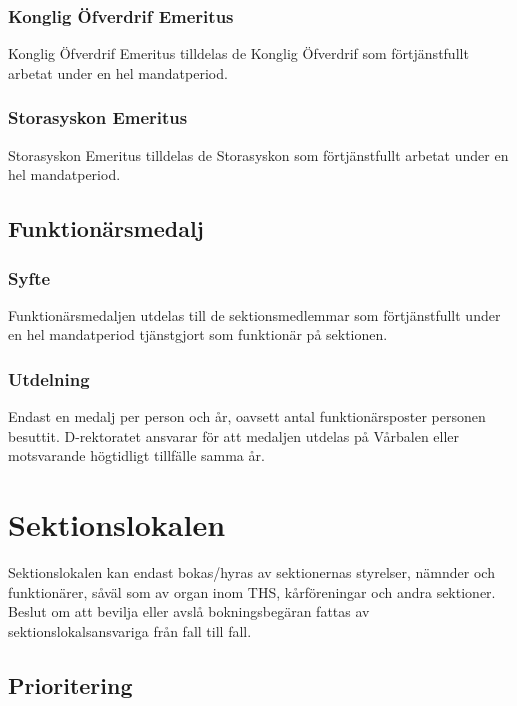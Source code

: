 \documentclass[a4paper,12pt]{article}
\begin{document}
\subsubsection{Konglig Öfverdrif Emeritus}

Konglig Öfverdrif Emeritus tilldelas de Konglig Öfverdrif som förtjänstfullt arbetat under en hel mandatperiod.

\subsubsection{Storasyskon Emeritus}

Storasyskon Emeritus tilldelas de Storasyskon som förtjänstfullt arbetat under en hel mandatperiod.

\subsection{Funktionärsmedalj}

\subsubsection{Syfte}

Funktionärsmedaljen utdelas till de sektionsmedlemmar som förtjänstfullt under en hel mandatperiod tjänstgjort som funktionär på sektionen.

\subsubsection{Utdelning}

Endast en medalj per person och år, oavsett antal funktionärsposter personen besuttit. D-rektoratet ansvarar för att medaljen utdelas på Vårbalen eller motsvarande högtidligt tillfälle samma år.

\section{Sektionslokalen}

Sektionslokalen kan endast bokas/hyras av sektionernas styrelser, nämnder och funktionärer, såväl som av organ inom THS, kårföreningar och andra sektioner. Beslut om att bevilja eller avslå bokningsbegäran fattas av sektionslokalsansvariga från fall till fall.

\subsection{Prioritering}
\end{document}
